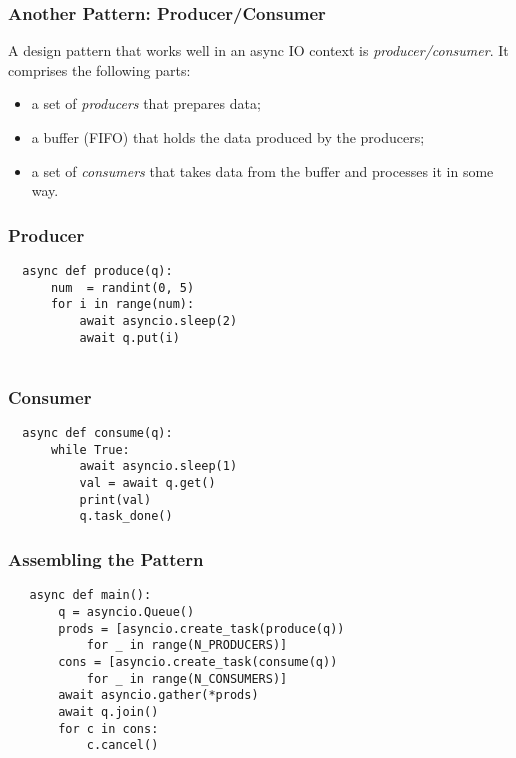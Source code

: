 \documentclass[10pt]{beamer}
\begin{document}
\begin{frame}
  \frametitle{Another Pattern: Producer/Consumer}
  
  A design pattern that works well in an async IO context is 
  \emph{producer/consumer}. It comprises the following parts:
  
  \begin{itemize}
    \item a set of \emph{producers} that prepares data;
    \item a buffer (FIFO) that holds the data produced by the producers;
    \item a set of \emph{consumers} that takes data from the buffer and 
    processes it in some way.
  \end{itemize}  
        
\end{frame}
  
\begin{frame}[fragile]
  \frametitle{Producer}
  
  \begin{verbatim}
  async def produce(q):
      num  = randint(0, 5)
      for i in range(num):
          await asyncio.sleep(2)
          await q.put(i)
      
  \end{verbatim}
    
\end{frame}
  
\begin{frame}[fragile]
  \frametitle{Consumer}
  
  \begin{verbatim}
  async def consume(q):
      while True:
          await asyncio.sleep(1)
          val = await q.get()
          print(val)
          q.task_done()      
  \end{verbatim}
    
\end{frame}

\begin{frame}[fragile]
  \frametitle{Assembling the Pattern}
  
  \begin{verbatim}
   async def main():
       q = asyncio.Queue()
       prods = [asyncio.create_task(produce(q)) 
           for _ in range(N_PRODUCERS)]
       cons = [asyncio.create_task(consume(q)) 
           for _ in range(N_CONSUMERS)]
       await asyncio.gather(*prods)
       await q.join()
       for c in cons:
           c.cancel()   
  \end{verbatim}
    
\end{frame}
\end{document}
